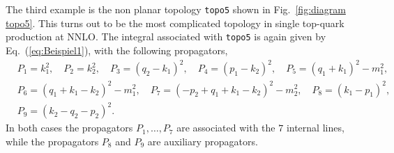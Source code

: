 \documentclass[a4paper,12pt]{scrartcl}
\def\Eq#1{{Eq.~(\ref{#1})}}
\def\Fig#1{{Fig.~\ref{#1}}}
\begin{document}
The third example is the non planar topology \texttt{topo5} shown in
\Fig{fig:diagram topo5}. This turns out to be the most
complicated topology in single top-quark production at NNLO.
The integral associated with \texttt{topo5} is again given by
\Eq{eq:Beispiel1}, with the following propagators,
\begin{eqnarray*}
  &P_{1}=k_1^2, \quad
  P_{2}=k_2^2, \quad
  P_{3}=(q_{2}-k_{1})^2, \quad
  P_{4}=(p_{1}-k_{2})^2, \quad
  P_{5}=(q_{1}+k_{1})^2-m_{1}^2, \\
  &P_{6}=(q_{1}+k_{1}-k_{2})^2-m_1^2, \quad
  P_{7}=(-p_{2}+q_{1}+k_{1}-k_{2})^2-m_2^2, \quad
  P_{8}=(k_{1}-p_{1})^2, \\
  &P_{9}=(k_{2}-q_{2}-p_{2})^2.
\end{eqnarray*}
In both cases the propagators $P_{1},\dots,P_{7}$ are associated with
the $7$ internal lines, while the propagators $P_{8}$ and $P_{9}$ are
auxiliary propagators.
\end{document}
